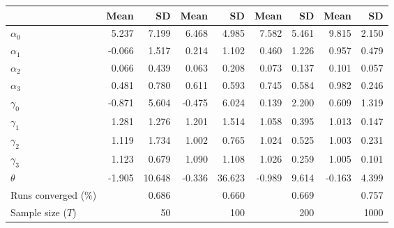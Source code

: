 
\begin{tabular}[t]{lrrrrrrrr}
\toprule
  & Mean & SD & Mean  & SD  & Mean   & SD   & Mean    & SD   \\
\midrule
$\alpha_{0}$ & 5.237 & 7.199 & 6.468 & 4.985 & 7.582 & 5.461 & 9.815 & 2.150\\
$\alpha_{1}$ & -0.066 & 1.517 & 0.214 & 1.102 & 0.460 & 1.226 & 0.957 & 0.479\\
$\alpha_{2}$ & 0.066 & 0.439 & 0.063 & 0.208 & 0.073 & 0.137 & 0.101 & 0.057\\
$\alpha_{3}$ & 0.481 & 0.780 & 0.611 & 0.593 & 0.745 & 0.584 & 0.982 & 0.246\\
$\gamma_{0}$ & -0.871 & 5.604 & -0.475 & 6.024 & 0.139 & 2.200 & 0.609 & 1.319\\
$\gamma_{1}$ & 1.281 & 1.276 & 1.201 & 1.514 & 1.058 & 0.395 & 1.013 & 0.147\\
$\gamma_{2}$ & 1.119 & 1.734 & 1.002 & 0.765 & 1.024 & 0.525 & 1.003 & 0.231\\
$\gamma_{3}$ & 1.123 & 0.679 & 1.090 & 1.108 & 1.026 & 0.259 & 1.005 & 0.101\\
$\theta$ & -1.905 & 10.648 & -0.336 & 36.623 & -0.989 & 9.614 & -0.163 & 4.399\\
Runs converged (\%) &  & 0.686 &  & 0.660 &  & 0.669 &  & 0.757\\
Sample size ($T$) &  & 50 &  & 100 &  & 200 &  & 1000\\
\bottomrule
\end{tabular}
